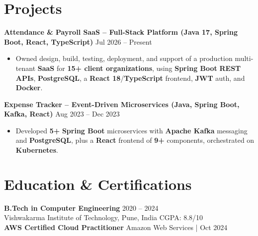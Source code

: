 \documentclass[a4paper,10pt]{article}
\begin{document}
\section*{Projects}

\textbf{Attendance \& Payroll SaaS -- Full-Stack Platform (Java 17, Spring Boot, React, TypeScript)} \hfill Jul 2026 -- Present
\begin{itemize}[leftmargin=*]
    \item Owned design, build, testing, deployment, and support of a production multi-tenant \textbf{SaaS} for \textbf{15+ client organizations}, using \textbf{Spring Boot} \textbf{REST APIs}, \textbf{PostgreSQL}, a \textbf{React 18}/\textbf{TypeScript} frontend, \textbf{JWT} auth, and \textbf{Docker}.
\end{itemize}

\textbf{Expense Tracker -- Event-Driven Microservices (Java, Spring Boot, Kafka, React)} \hfill Aug 2023 -- Dec 2023
\begin{itemize}[leftmargin=*]
    \item Developed \textbf{5+} \textbf{Spring Boot} microservices with \textbf{Apache Kafka} messaging and \textbf{PostgreSQL}, plus a \textbf{React} frontend of \textbf{9+} components, orchestrated on \textbf{Kubernetes}.
\end{itemize}

\section*{Education \& Certifications}
\textbf{B.Tech in Computer Engineering} \hfill 2020 -- 2024 \\
Vishwakarma Institute of Technology, Pune, India \hfill CGPA: 8.8/10 \\
\textbf{AWS Certified Cloud Practitioner} \hfill Amazon Web Services \;|\; Oct 2024
\end{document}
